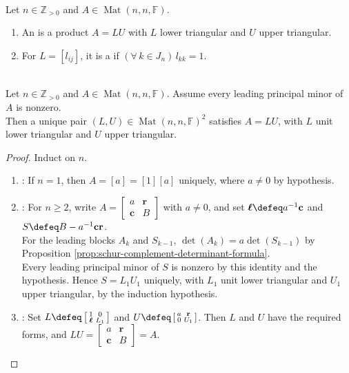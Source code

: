 \begin{definition} \label{def:lu-factorization} \\
Let $n\in\mathbb{Z}_{>0}$ and $A\in\operatorname{Mat}(n,n,\mathbb{F})$.
\begin{enumerate}[label=(\roman*)]
\setlength{\itemsep}{0pt}
\item An  is a product $A=LU$ with $L$ lower triangular and $U$ upper triangular.
\item For $L=[l_{ij}]$, it is a  if $(\forall\,k\in J_n)\,l_{kk}=1$.
\end{enumerate}
\end{definition}

\begin{theorem} \label{thm:lu-factorization-leading-principal-minors} \\
Let $n\in\mathbb{Z}_{>0}$ and $A\in\operatorname{Mat}(n,n,\mathbb{F})$. Assume every leading principal minor of $A$ is nonzero.\\
Then a unique pair $(L,U)\in\operatorname{Mat}(n,n,\mathbb{F})^2$ satisfies $A=LU$, with $L$ unit lower triangular and $U$ upper triangular.
\begin{proof}
Induct on $n$.
\begin{enumerate}[label=(\roman*)]
\setlength{\itemsep}{0pt}
\item {}: If $n=1$, then $A=[a]=[1][a]$ uniquely, where $a\neq0$ by hypothesis.
\item {}: For $n\geq2$, write $A=\left[\begin{smallmatrix}a&\mathbf{r}\\\mathbf{c}&B\end{smallmatrix}\right]$ with $a\neq0$, and set $\boldsymbol{\ell}\defeq a^{-1}\mathbf{c}$ and $S\defeq B-a^{-1}\mathbf{c}\mathbf{r}$.\\
For the leading blocks $A_k$ and $S_{k-1}$, $\det(A_k)=a\det(S_{k-1})$ by Proposition \ref{prop:schur-complement-determinant-formula}.\\
Every leading principal minor of $S$ is nonzero by this identity and the hypothesis. Hence $S=L_1U_1$ uniquely, with $L_1$ unit lower triangular and $U_1$ upper triangular, by the induction hypothesis.
\item {}: Set $L\defeq\left[\begin{smallmatrix}1&0\\\boldsymbol{\ell}&L_1\end{smallmatrix}\right]$ and $U\defeq\left[\begin{smallmatrix}a&\mathbf{r}\\0&U_1\end{smallmatrix}\right]$. Then $L$ and $U$ have the required forms, and $LU=\left[\begin{smallmatrix}a&\mathbf{r}\\\mathbf{c}&B\end{smallmatrix}\right]=A$.

\end{enumerate}
\end{proof}
\end{theorem}
